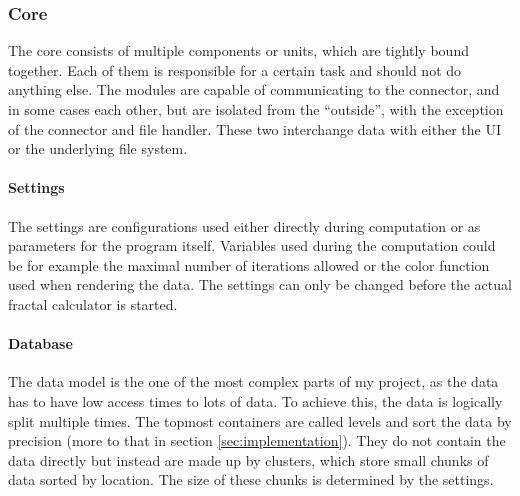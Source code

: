 \documentclass[10pt,a4paper,titlepage]{article}
\begin{document}
\begin{figure}
	\end{figure}
	
	\subsubsection{Core}
	The core consists of multiple components or units, which are tightly bound together. Each of them is responsible for a certain task and should not do anything else. The modules are capable of communicating to the connector, and in some cases each other, but are isolated from the ``outside'', with the exception of the connector and file handler. These two interchange data with either the UI or the underlying file system.
	\paragraph{Settings}
	The settings are configurations used either directly during computation or as parameters for the program itself. Variables used during the computation could be for example the maximal number of iterations allowed  or the color function used when rendering the data. The settings can only be changed before the actual fractal calculator is started.
	\paragraph{Database}
	The data model is the one of the most complex parts of my project, as the data has to have low access times to lots of data. To achieve this, the data is logically split multiple times. The topmost containers are called levels and sort the data by precision (more to that in section \ref{sec:implementation}). They do not contain the data directly but instead are made up by clusters, which store small chunks of data sorted by location. The size of these chunks is determined by the settings.
\end{document}
